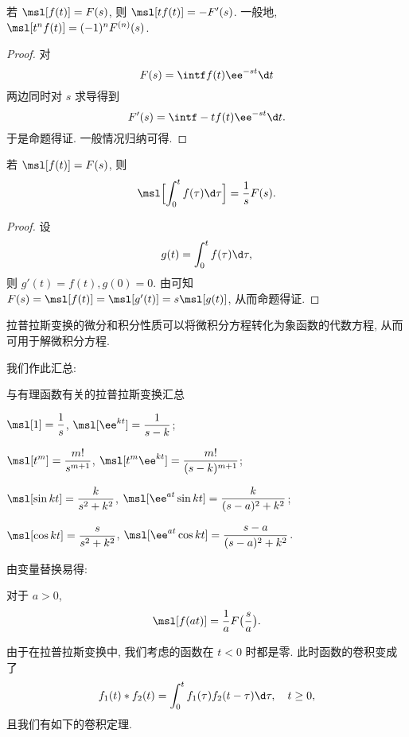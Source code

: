 \begin{theorem}[乘多项式性质]
  \label{thm:laplace-multiply-polynomial-property}
  若 $\msl[f(t)]=F(s)$, 则 $\msl[tf(t)]=-F'(s)$.
  一般地, $\msl[t^nf(t)]=(-1)^n F^{(n)}(s)$.
\end{theorem}

\begin{proof}
  对
  \[
    F(s)=\intf f(t)\ee^{-st}\d t
  \]
  两边同时对 $s$ 求导得到
  \[
    F'(s)=\intf -tf(t)\ee^{-st}\d t.
  \]
  于是命题得证. 一般情况归纳可得.
\end{proof}

\begin{theorem}[积分性质]
  \label{thm:laplace-integral-property}
  若 $\msl[f(t)]=F(s)$, 则
  \[
    \msl\Bigl[\int_0^t f(\tau)\d\tau\Bigr]
    =\frac1{s}F(s).
  \]
\end{theorem}

\begin{proof}
  设
  \[
    g(t)=\int_0^t f(\tau)\d \tau,
  \]
  则 $g'(t)=f(t), g(0)=0$.
  由\thmLDif 可知 $F(s)=\msl[f(t)]=\msl[g'(t)]=s\msl[g(t)]$, 从而命题得证.
\end{proof}

拉普拉斯变换的微分和积分性质可以将微积分方程转化为象函数的代数方程, 从而可用于解微积分方程.

我们作此汇总:
\begin{fifth}{与有理函数有关的拉普拉斯变换汇总}
  \begin{enuma}
    \item $\displaystyle\msl[1]=\frac1s$, 
    $\displaystyle \msl[\ee^{kt}]=\frac1{s-k}$;
    \item $\displaystyle\msl[t^m]=\frac{m!}{s^{m+1}}$, 
    $\displaystyle\msl[t^m\ee^{kt}]=\frac{m!}{(s-k)^{m+1}}$;
    \item $\displaystyle\msl[\sin kt]=\frac{k}{s^2+k^2}$, 
    $\displaystyle\msl[\ee^{at}\sin kt]=\frac{k}{(s-a)^2+k^2}$;
    \item $\displaystyle\msl[\cos kt]=\frac{s}{s^2+k^2}$,
    $\displaystyle\msl[\ee^{at}\cos kt]=\frac{s-a}{(s-a)^2+k^2}$.
  \end{enuma}
\end{fifth}

由变量替换易得:
\begin{theorem}[相似性质]\label{thm:laplace-similar-property}
  对于 $a>0$, 
  \[
    \msl[f(at)]=\frac1a F\bigl(\frac sa\bigr).
  \]
\end{theorem}

由于在拉普拉斯变换中, 我们考虑的函数在 $t<0$ 时都是零.
此时函数的卷积变成了
\[
   f_1(t)\ast f_2(t)
  =\int_0^t f_1(\tau)f_2(t-\tau)\d \tau,\quad t\ge 0,
\]
且我们有如下的卷积定理.

